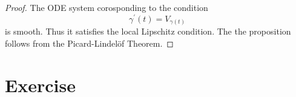 \documentclass[../main.tex]{subfiles}
\begin{document}
\begin{proof}
    The ODE system corosponding to the condition \[
      \gamma ^{\prime} \left( t \right)= V_{ \gamma \left( t \right) } 
     \] is smooth. Thus it satisfies the local Lipschitz condition. The the proposition follows from the Picard-Lindelöf Theorem. 
\end{proof}

\section{Exercise}
\end{document}
